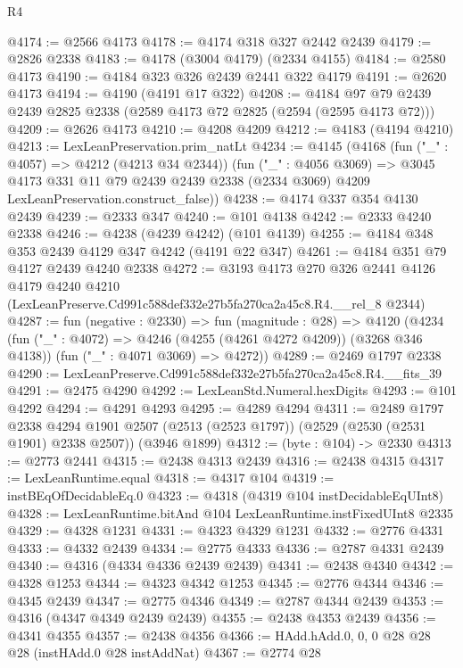 \begin{lexlean}{R4}
\begin{coremodule}
@4174 := @2566 @4173
@4178 := @4174 @318 @327 @2442 @2439
@4179 := @2826 @2338
@4183 := @4178 (@3004 @4179) (@2334 @4155)
@4184 := @2580 @4173
@4190 := @4184 @323 @326 @2439 @2441 @322 @4179
@4191 := @2620 @4173
@4194 := @4190 (@4191 @17 @322)
@4208 := @4184 @97 @79 @2439 @2439 @2825 @2338 (@2589 @4173 @72 @2825 (@2594 (@2595 @4173 @72)))
@4209 := @2626 @4173
@4210 := @4208 @4209
@4212 := @4183 (@4194 @4210)
@4213 := LexLeanPreservation.prim_natLt
@4234 := @4145
    (@4168
      (fun ("_" : @4057) => @4212 (@4213 @34 @2344))
      (fun ("_" : @4056 @3069) =>
      @3045
        @4173
        @331
        @11
        @79
        @2439
        @2439
        @2338
        (@2334 @3069)
        @4209
        LexLeanPreservation.construct_false))
@4238 := @4174 @337 @354 @4130 @2439
@4239 := @2333 @347
@4240 := @101 @4138
@4242 := @2333 @4240 @2338
@4246 := @4238 (@4239 @4242) (@101 @4139)
@4255 := @4184 @348 @353 @2439 @4129 @347 @4242 (@4191 @22 @347)
@4261 := @4184 @351 @79 @4127 @2439 @4240 @2338
@4272 := @3193
    @4173
    @270
    @326
    @2441
    @4126
    @4179
    @4240
    @4210
    (LexLeanPreserve.Cd991c588def332e27b5fa270ca2a45c8.R4.__rel_8 @2344)
@4287 := fun (negative : @2330) =>
  fun (magnitude : @28) =>
  @4120
    (@4234
      (fun ("_" : @4072) => @4246 (@4255 (@4261 @4272 @4209)) (@3268 @346 @4138))
      (fun ("_" : @4071 @3069) => @4272))
@4289 := @2469 @1797 @2338
@4290 := LexLeanPreserve.Cd991c588def332e27b5fa270ca2a45c8.R4.__fits_39
@4291 := @2475 @4290
@4292 := LexLeanStd.Numeral.hexDigits
@4293 := @101 @4292
@4294 := @4291 @4293
@4295 := @4289 @4294
@4311 := @2489
    @1797
    @2338
    @4294
    @1901
    @2507
    (@2513 (@2523 @1797))
    (@2529 (@2530 (@2531 @1901) @2338 @2507))
    (@3946 @1899)
@4312 := (byte : @104) -> @2330
@4313 := @2773 @2441
@4315 := @2438 @4313 @2439
@4316 := @2438 @4315
@4317 := LexLeanRuntime.equal
@4318 := @4317 @104
@4319 := instBEqOfDecidableEq.{0}
@4323 := @4318 (@4319 @104 instDecidableEqUInt8)
@4328 := LexLeanRuntime.bitAnd @104 LexLeanRuntime.instFixedUInt8 @2335
@4329 := @4328 @1231
@4331 := @4323 @4329 @1231
@4332 := @2776 @4331
@4333 := @4332 @2439
@4334 := @2775 @4333
@4336 := @2787 @4331 @2439
@4340 := @4316 (@4334 @4336 @2439 @2439)
@4341 := @2438 @4340
@4342 := @4328 @1253
@4344 := @4323 @4342 @1253
@4345 := @2776 @4344
@4346 := @4345 @2439
@4347 := @2775 @4346
@4349 := @2787 @4344 @2439
@4353 := @4316 (@4347 @4349 @2439 @2439)
@4355 := @2438 @4353 @2439
@4356 := @4341 @4355
@4357 := @2438 @4356
@4366 := HAdd.hAdd.{0, 0, 0} @28 @28 @28 (instHAdd.{0} @28 instAddNat)
@4367 := @2774 @28

\end{coremodule}
\end{lexlean}
